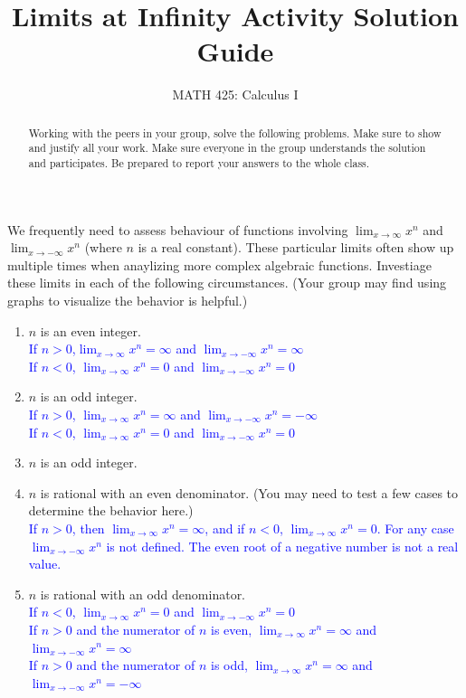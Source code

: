 \documentclass{ximera}
\title{Limits at Infinity Activity Solution Guide}
\author{MATH 425: Calculus I}
\begin{document}
\begin{abstract}
    Working with the peers in your group, solve the following problems. Make sure to show and justify all your work. Make sure everyone in the group understands the solution and participates. Be prepared to report your answers to the whole class. 
\end{abstract}
\maketitle

\begin{exercise}
  We frequently need to assess behaviour of functions involving $\lim_{x\rightarrow \infty}x^n$ and $\lim_{x\rightarrow -\infty}x^n$ (where $n$ is a real constant).  These particular limits often show up multiple times when anaylizing more complex algebraic functions.  Investiage these limits in each of the following circumstances. (Your group may find using graphs to visualize the behavior is helpful.)
  \begin{enumerate}
    \item $n$ is an even integer.\\
    \textcolor{blue}{If $n>0$,$\displaystyle\lim_{x\rightarrow \infty} x^n=\infty$ and $\displaystyle\lim_{x\rightarrow -\infty} x^n=\infty$\\
    If $n<0$, $\displaystyle \lim_{x\rightarrow \infty}x^n=0$ and $\displaystyle \lim_{x\rightarrow -\infty}x^n=0$}
    \item $n$ is an odd integer.\\
    \textcolor{blue}{If $n>0$, $\displaystyle\lim_{x\rightarrow \infty} x^n=\infty$ and $\displaystyle\lim_{x\rightarrow -\infty} x^n=-\infty$\\
    If $n<0$, $\displaystyle \lim_{x\rightarrow \infty}x^n=0$ and $\displaystyle \lim_{x\rightarrow -\infty}x^n=0$}
    \item $n$ is an odd integer.
    \item $n$ is rational with an even denominator. (You may need to test a few cases to determine the behavior here.)\\
    \textcolor{blue}{If $n>0$, then $\displaystyle \lim_{x\rightarrow \infty}x^n=\infty$, and if $n<0$, $\lim_{x\rightarrow \infty}x^n=0$.  For any case $\lim_{x\rightarrow -\infty}x^n$ is not defined.  The even root of a negative number is not a real value.}
    \item $n$ is rational with an odd denominator.\\
    \textcolor{blue}{If $n<0$, $\displaystyle \lim_{x\rightarrow \infty}x^n=0$ and $\displaystyle \lim_{x\rightarrow -\infty}x^n=0$\\
    If $n>0$ and the numerator of $n$ is even, $\displaystyle \lim_{x\rightarrow \infty}x^n=\infty$ and $\displaystyle \lim_{x\rightarrow -\infty}x^n=\infty$\\
    If $n>0$ and the numerator of $n$ is odd, $\displaystyle \lim_{x\rightarrow \infty}x^n=\infty$ and $\displaystyle \lim_{x\rightarrow -\infty}x^n=-\infty$}
  \end{enumerate}
\end{exercise}
\end{document}
